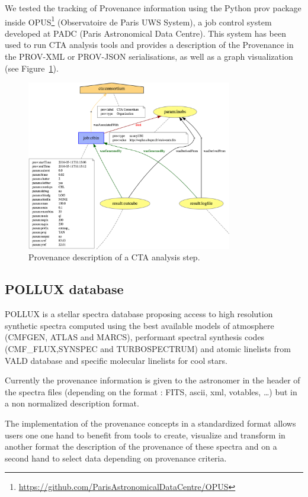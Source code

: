 We tested the tracking of Provenance information using the Python prov package inside OPUS\footnote{\url{https://github.com/ParisAstronomicalDataCentre/OPUS}} (Observatoire de Paris UWS System), a job control system developed at PADC (Paris Astronomical Data Centre). This system has been used to run CTA analysis tools and provides a description of the Provenance in the PROV-XML or PROV-JSON serialisations, as well as a graph visualization (see Figure~\ref{fig:cta_prov}).

\begin{figure}
\centering
\includegraphics[width=0.8\textwidth]{CTA_prov.png}
\caption{Provenance description of a CTA analysis step.}
\label{fig:cta_prov}
\end{figure}


\subsection{POLLUX database}

POLLUX is a stellar spectra database proposing access to high resolution synthetic spectra computed using the best available models of atmosphere (CMFGEN, ATLAS and MARCS), performant spectral synthesis codes (CMF\_FLUX,SYNSPEC and TURBOSPECTRUM) and atomic linelists from VALD database and specific molecular linelists for cool stars. 

Currently the provenance information is given to the astronomer in the header of the spectra files (depending on the format : FITS, ascii, xml, votables, …) but in a non normalized description format. 

The implementation of the provenance concepts in a standardized format allows users one one hand to benefit from tools to create, visualize and transform in another format the description of the provenance of these spectra and on a second hand to select data depending on provenance criteria.

